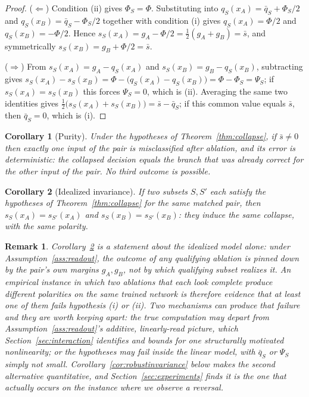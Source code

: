 \documentclass[11pt,a4paper]{article}
\newtheorem{corollary}{Corollary}
\newtheorem{remark}{Remark}
\begin{document}
\begin{proof}
($\Leftarrow$) Condition (ii) gives $\Phi_S=\Phi$. Substituting into
$q_S(x_A)=\bar q_S+\Phi_S/2$ and $q_S(x_B)=\bar q_S-\Phi_S/2$ together with
condition (i) gives $q_S(x_A)=\Phi/2$ and $q_S(x_B)=-\Phi/2$. Hence
$s_S(x_A)=g_A-\Phi/2=\tfrac12(g_A+g_B)=\bar s$, and
symmetrically $s_S(x_B)=g_B+\Phi/2=\bar s$.

($\Rightarrow$) From $s_S(x_A)=g_A-q_S(x_A)$ and
$s_S(x_B)=g_B-q_S(x_B)$, subtracting gives
$s_S(x_A)-s_S(x_B)=\Phi-\bigl(q_S(x_A)-q_S(x_B)\bigr)=\Phi-\Phi_S=
\Psi_S$; if $s_S(x_A)=s_S(x_B)$ this forces $\Psi_S=0$, which is (ii).
Averaging the same two identities gives
$\tfrac12\bigl(s_S(x_A)+s_S(x_B)\bigr)=\bar s-\bar q_S$; if this common
value equals $\bar s$, then $\bar q_S=0$, which is (i).
\end{proof}

\begin{corollary}[Purity]
\label{cor:purity}
Under the hypotheses of Theorem~\ref{thm:collapse}, if $\bar s\ne0$ then
exactly one input of the pair is misclassified after ablation, and its error
is deterministic: the collapsed decision equals the branch that was already
correct for the \emph{other} input of the pair. No third outcome is possible.
\end{corollary}

\begin{corollary}[Idealized invariance]
\label{cor:invariance}
If two subsets $S,S'$ each satisfy the hypotheses of Theorem~\ref{thm:collapse}
for the same matched pair, then $s_S(x_A)=s_{S'}(x_A)$ and
$s_S(x_B)=s_{S'}(x_B)$: they induce the same collapse, with the same
polarity.
\end{corollary}

\begin{remark}
Corollary~\ref{cor:invariance} is a statement about the idealized model alone:
under Assumption~\ref{ass:readout}, the outcome of any qualifying ablation is
pinned down by the pair's own margins $g_A,g_B$, not by which qualifying
subset realizes it. An empirical instance in which two ablations that each
look complete produce \emph{different} polarities on the same trained network
is therefore evidence that at least one of them fails hypothesis (i) or (ii).
Two mechanisms can produce that failure and they are worth keeping apart: the
true computation may depart from Assumption~\ref{ass:readout}'s additive,
linearly-read picture, which Section~\ref{sec:interaction} identifies and
bounds for one structurally motivated nonlinearity; or the hypotheses may fail
\emph{inside} the linear model, with $\bar q_S$ or $\Psi_S$ simply not small.
Corollary~\ref{cor:robustinvariance} below makes the second alternative
quantitative, and Section~\ref{sec:experiments} finds it is the one that
actually occurs on the instance where we observe a reversal.
\end{remark}
\end{document}
